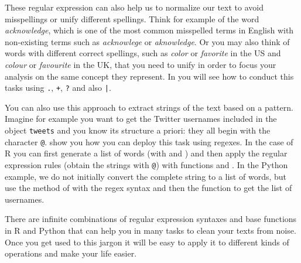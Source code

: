 
These regular expression can also help us to normalize our text to avoid misspellings or unify different spellings. Think for example of the word \emph{acknowledge}, which is one of the most common misspelled terms in English with non-existing terms such as \emph{acknowlege} or \emph{aknowledge}. Or you may also think of words with different correct spellings, such as \emph{color} or \emph{favorite} in the US and \emph{colour} or \emph{favourite} in the UK, that you need to unify in order to focus your analysis on the same concept they represent. In  you will see how to conduct this tasks using \verb+.+, \verb|+|, \verb+?+ and also \verb+|+.


You can also use this approach to extract strings of the text based on a pattern. Imagine for example you want to get the Twitter usernames included in the object \texttt{tweets} and you know its structure a priori: they all begin with the character \texttt{@}.  show you how you can deploy this task using regexes. In the case of R you can first generate a list of words (with  and ) and then apply the regular expression rules (obtain the strings with \texttt{@}) with functions  and . In the Python example, we do not initially convert the complete string to a list of words, but use the  method of  with the regex syntax and then the function  to get the list of usernames.


There are infinite combinations of regular expression syntaxes and base functions in R and Python that can help you in many tasks to clean your texts from noise. Once you get used to this jargon it will be easy to apply it to different kinds of operations and make your life easier.
